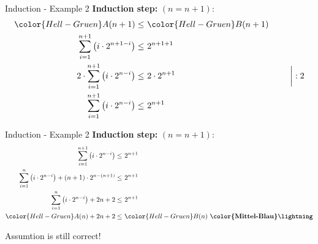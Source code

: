 
\begin{frame}{Induction - Example 2}
  \textbf{Induction step:}
  $(n = n +1)$:
  \begin{align*}
    {\color{Hell-Gruen}A}(n+1) \leq &~ {\color{Hell-Gruen}B}(n+1)\\
    \sum\limits^{n+1}_{i=1} \left(i \cdot 2^{n+1-i} \right)
    \leq &~ 2^{n+1+1}\\
    2 \cdot \sum\limits^{n+1}_{i=1} \left(i \cdot 2^{n-i} \right)
    \leq &~ 2 \cdot 2^{n+1} & \hspace*{1.5em} \bigg\vert :2\\
    \sum\limits^{n+1}_{i=1} \left(i \cdot 2^{n-i} \right)
    \leq &~ 2^{n+1}\\
  \end{align*}
\end{frame}


\begin{frame}{Induction - Example 2}
  \textbf{Induction step:}
  $(n = n +1)$:
  \begin{align*}
    \sum\limits^{n+1}_{i=1} \left(i \cdot 2^{n-i} \right)
    \leq &~ 2^{n+1}\\
    \sum\limits^{n}_{i=1} \left(i \cdot 2^{n-i}\right)
    + \left(n + 1\right) \cdot 2^{n - \left(n + 1\right)}
    \leq &~ 2^{n+1}\\
    \sum\limits^{n}_{i=1} \left(i \cdot 2^{n-i}\right)
    + 2n + 2
    \leq &~ 2^{n+1}\\
   {\color{Hell-Gruen}A}(n) + 2n + 2
   \leq &~ {\color{Hell-Gruen}B}(n) ~\textbf{\color{Mittel-Blau}\lightning}
  \end{align*}
  \begin{center}
    \alert{Assumtion is still correct!}
  \end{center}
\end{frame}